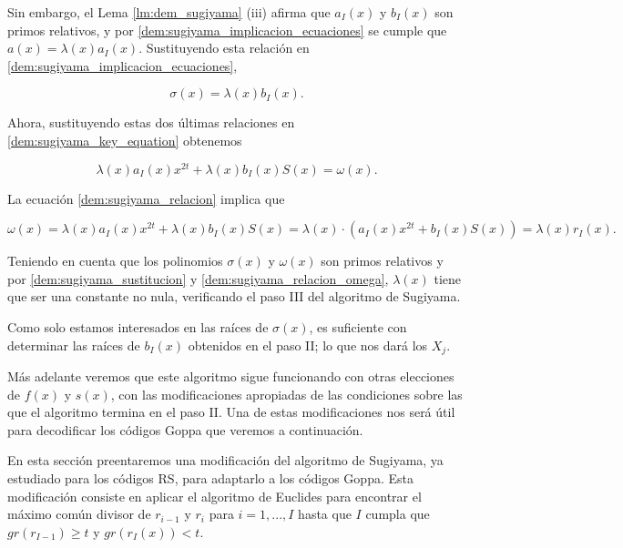 Sin embargo, el Lema \ref{lm:dem_sugiyama} (iii) afirma que $a_I(x)$ y $b_I(x)$ son primos relativos, y por \ref{dem:sugiyama_implicacion_ecuaciones} se cumple que $a(x) = \lambda(x) a_I(x)$. Sustituyendo esta relación en \ref{dem:sugiyama_implicacion_ecuaciones},

\begin{equation}
    \label{dem:sugiyama_sustitucion}
    \sigma(x) = \lambda(x) b_I(x).
\end{equation}

Ahora, sustituyendo estas dos últimas relaciones en \ref{dem:sugiyama_key_equation} obtenemos

$$\lambda(x) a_I(x) x^{2t} + \lambda(x) b_I(x) S(x) = \omega(x).$$ 

La ecuación \ref{dem:sugiyama_relacion} implica que

\begin{equation}
    \label{dem:sugiyama_relacion_omega}
    \omega(x) = \lambda(x) a_I(x) x^{2t} + \lambda(x) b_I(x) S(x) = \lambda(x) \cdot \left( a_I(x) x^{2t} + b_I(x) S(x) \right) = \lambda(x) r_I(x).
\end{equation}

Teniendo en cuenta que los polinomios $\sigma(x)$ y $\omega(x)$ son primos relativos y por \ref{dem:sugiyama_sustitucion} y \ref{dem:sugiyama_relacion_omega}, $\lambda(x)$ tiene que ser una constante no nula, verificando el paso III del algoritmo de Sugiyama.

Como solo estamos interesados en las raíces de $\sigma(x)$, es suficiente con determinar las raíces de $b_I(x)$ obtenidos en el paso II; lo que nos dará los $X_j$. 

Más adelante veremos que este algoritmo sigue funcionando con otras elecciones de $f(x)$ y $s(x)$, con las modificaciones apropiadas de las condiciones sobre las que el algoritmo termina en el paso II. Una de estas modificaciones nos será útil para decodificar los códigos Goppa que veremos a continuación.



En esta sección preentaremos una modificación del algoritmo de Sugiyama, ya estudiado para los códigos RS, para adaptarlo a los códigos Goppa. Esta modificación consiste en aplicar el algoritmo de Euclides para encontrar el máximo común divisor de $r_{i-1}$ y $r_i$ para $i = 1,..., I$ hasta que $I$  cumpla que $gr(r_{I-1}) \geq t$ y $gr(r_I(x)) < t$.


